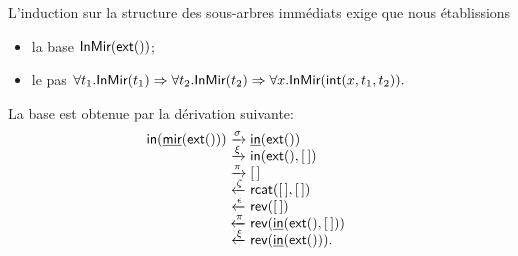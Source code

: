 L'induction sur la structure des sous-arbres immédiats exige que nous
établissions
\begin{itemize}

  \item la base
  \(\textsf{InMir}({\textsf{ext}()})\);

  \item le pas \(\forall t_1.\textsf{InMir}({t_1}) \Rightarrow
  \forall t_2.\textsf{InMir}({t_2}) \Rightarrow \forall
  x.\textsf{InMir}({\textsf{int}(x,t_1,t_2)}).\)

\end{itemize}
La base est obtenue par la dérivation suivante:
\begin{equation*}
\begin{array}{@{}r@{\;}c@{\;}l@{\qquad}}
  \fun{in}(\ufun{mir}(\fun{ext}()))
  & \xrightarrow{\smash{\sigma}}
  & \ufun{in}(\fun{ext}())\\
  & \xrightarrow{\smash{\xi}}
  & \fun{in}(\fun{ext}(),\el)\\
  & \xrightarrow{\smash{\pi}}
  & \el\\
  & \xleftarrow{\smash{\zeta}}
  & \fun{rcat}(\el,\el)\\
  & \xleftarrow{\smash{\epsilon}}
  & \fun{rev}(\el)\\
  & \xleftarrow{\smash{\pi}}
  & \fun{rev}(\ufun{in}(\fun{ext}(),\el))\\
  & \xleftarrow{\smash{\xi}}
  & \fun{rev}(\ufun{in}(\fun{ext}())).
  \index{rcat@\fun{rcat/2}}\index{rev@\fun{rev/1}}
\end{array}
\end{equation*}



